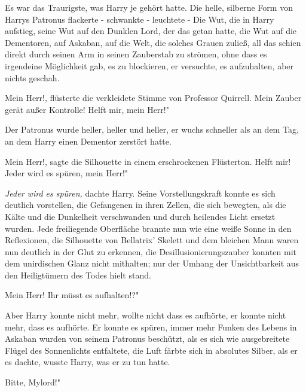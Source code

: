 Es war das Traurigste, was Harry je gehört hatte. Die helle, silberne Form von
Harrys Patronus flackerte - schwankte - leuchtete - Die Wut, die in Harry
aufstieg, seine Wut auf den Dunklen Lord, der das getan hatte, die Wut auf die
Dementoren, auf Askaban, auf die Welt, die solches Grauen zuließ, all das schien
direkt durch seinen Arm in seinen Zauberstab zu strömen, ohne dass es irgendeine
Möglichkeit gab, es zu blockieren, er versuchte, es aufzuhalten, aber nichts
geschah.

\glqq Mein Herr!\grqq{}, flüsterte die verkleidete Stimme von Professor
Quirrell. \glqq Mein Zauber gerät außer Kontrolle! Helft mir, mein Herr!"

Der Patronus wurde heller, heller und heller, er wuchs schneller als an dem Tag,
an dem Harry einen Dementor zerstört hatte.

\glqq Mein Herr!\grqq{}, sagte die Silhouette in einem erschrockenen Flüsterton.
\glqq Helft mir! Jeder wird es spüren, mein Herr!"

\emph{Jeder wird es spüren,} dachte Harry. Seine Vorstellungskraft konnte es
sich deutlich vorstellen, die Gefangenen in ihren Zellen, die sich bewegten, als
die Kälte und die Dunkelheit verschwanden und durch heilendes Licht ersetzt
wurden. Jede freiliegende Oberfläche brannte nun wie eine weiße Sonne in den
Reflexionen, die Silhouette von Bellatrix' Skelett und dem bleichen Mann waren
nun deutlich in der Glut zu erkennen, die Desillusionierungszauber konnten mit
dem unirdischen Glanz nicht mithalten; nur der Umhang der Unsichtbarkeit aus den
Heiligtümern des Todes hielt stand.

\glqq Mein Herr! Ihr müsst es aufhalten!?"

Aber Harry konnte nicht mehr, wollte nicht dass es aufhörte, er konnte nicht
mehr, dass es aufhörte. Er konnte es spüren, immer mehr Funken des Lebens in
Askaban wurden von seinem Patronus beschützt, als es sich wie ausgebreitete
Flügel des Sonnenlichts entfaltete, die Luft färbte sich in absolutes Silber,
als er es dachte, wusste Harry, was er zu tun hatte.

\glqq Bitte, Mylord!"

